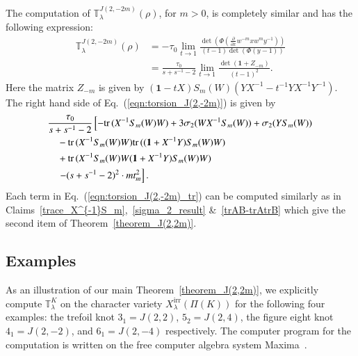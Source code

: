 \documentclass[a4paper]{amsart}
\theoremstyle{plain}
\theoremstyle{definition}
\theoremstyle{remark}
\newcommand{\I}{\mathbf{1}}
\newcommand{\trace}{{\rm tr}\,}
\begin{document}
The computation of ${\mathbb T}^{J(2, -2m)}_{\lambda} (\rho)$, for $m>0$, is completely similar and has the following expression:
\begin{align}
{\mathbb T}^{J(2, -2m)}_{\lambda}(\rho)
&=
-\tau_0
\lim_{t \to 1}
\frac{\det ( \Phi(\frac{\partial}{\partial x}w^{-m}  x w^m y^{-1})) }
            {(t-1)\det ( \Phi(y-1))} \nonumber \\
&=
\frac{\tau_0}{s+s^{-1} - 2}
\lim_{t \to 1}
\frac{\det(\I+Z_{-m})}{(t-1)^2}. \label{eqn:torsion_J(2,-2m)}
\end{align}
Here the matrix $Z_{-m}$ is given by 
$(\I-tX)S_m(W)(YX^{-1}- t^{-1}YX^{-1}Y^{-1})$.
The right hand side of Eq.~(\ref{eqn:torsion_J(2,-2m)}) is given by
\begin{align}\label{eqn:torsion_J(2,-2m)_tr}
&\frac{\tau_0}{s+s^{-1}-2}
\left[
  -\trace(X^{-1}S_m(W)W)
   +3\sigma_2(WX^{-1}S_m(W)) + \sigma_2(YS_m(W))
\right. \\
&\quad 
-\trace(X^{-1}S_m(W)W)\trace((\I+X^{-1}Y)S_m(W)W)  \nonumber\\
&\quad 
+ \trace(X^{-1}S_m(W)W(\I+X^{-1}Y)S_m(W)W)  \nonumber \\
&\quad \left.- (s+s^{-1} - 2)^2 \cdot mt_m^2 \right]. \nonumber
\end{align}
Each term in Eq.~(\ref{eqn:torsion_J(2,-2m)_tr}) can be computed similarly as in Claims~\ref{trace_X^{-1}S_m},~\ref{sigma_2_result} \&~\ref{trAB-trAtrB} which give the second item of Theorem~\ref{theorem_J(2,2m)}.

\subsection{Examples}
\label{Sexamples}
As an illustration of our main Theorem~\ref{theorem_J(2,2m)}, we explicitly compute ${\mathbb T}^{K}_{\lambda}$ on the character variety $X^{\mathrm{irr}}_\lambda(\Pi(K))$ for the following four examples: the trefoil knot $3_1 = J(2,2)$, $5_2 = J(2,4)$, the figure eight knot $4_1 = J(2,-2)$, and $6_1 = J(2,-4)$ respectively. The computer program for the computation is written on the free computer algebra system Maxima~\cite{Max}.
\end{document}
